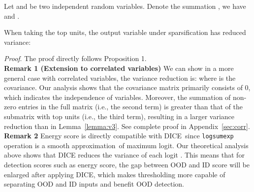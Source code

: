 \documentclass[runningheads]{llncs}
\newcommand{\methodAbbr}{DICE~}
\begin{document}
\begin{proposition}
\label{prop:sum_gaussian}
Let  and  be two independent {random variables}. Denote the summation , we have  and .
\end{proposition}


\begin{lemma}
\label{lemma:v3}
When taking the top  units, the output variable  under sparsification has reduced variance:

\end{lemma}
\noindent \textit{Proof}. The proof directly follows Proposition 1. \\


\noindent \textbf{Remark 1 (Extension to correlated variables)} We can show in a more general case with correlated variables, the variance reduction is:  
where  is the covariance. Our analysis shows that the covariance matrix primarily consists of 0, which indicates the independence of variables. Moreover, the summation of non-zero entries in the full matrix (i.e., the second term) is greater than that of the submatrix with top units (i.e., the third term), resulting in a larger variance reduction than in Lemma~\ref{lemma:v3}. 
See complete proof in Appendix~\ref{sec:corr}. \\

\noindent \textbf{Remark 2} 
 Energy score is directly compatible with \methodAbbr since \texttt{logsumexp} operation is a smooth approximation~of maximum logit. Our theoretical analysis above shows that DICE reduces the variance of each logit . 
This means that for detection scores such as energy score, the gap between OOD and ID score will be enlarged after applying DICE, which makes thresholding more capable of separating OOD and ID inputs and benefit OOD detection. \\


\begin{table}[t]
\centering
     \caption{\small Difference between the mean of ID's output and OOD's output. Here we use CIFAR-100 as ID data and {= - } is averaged over six common OOD benchmark datasets described in Section~\ref{sec:experiments}.}
    \label{tab:mean_shift}
\end{table}
\end{document}
